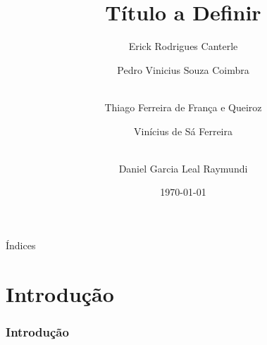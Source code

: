 \documentclass[aspectratio=169,t,xcolor=table]{beamer}
\begin{document}
	
	

\title{Título a Definir}
\author{Erick Rodrigues Canterle  \and  Pedro Vinicius Souza Coimbra \and \\
	Thiago Ferreira de França e Queiroz \and Vinícius de Sá Ferreira  \and \\
	Daniel Garcia Leal Raymundi}

\date{\today}
\frame[noframenumbering]{\titlepage}



\begin{frame}{Índices}
	\tableofcontents
\end{frame}



\section{Introdução}

\begin{frame}
	\frametitle{Introdução}
\end{frame}


\begin{frame}{}
	
\end{frame}


\end{document}
